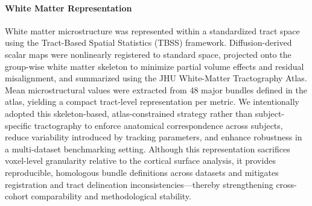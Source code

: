 \paragraph{White Matter Representation}
White matter microstructure was represented within a standardized tract space using the Tract-Based 
Spatial Statistics (TBSS) framework. Diffusion-derived scalar maps were nonlinearly registered to 
standard space, projected onto the group-wise white matter skeleton to minimize partial volume effects 
and residual misalignment, and summarized using the JHU White-Matter Tractography Atlas. Mean 
microstructural values were extracted from 48 major bundles defined in the atlas, yielding a compact 
tract-level representation per metric. We intentionally adopted this skeleton-based, atlas-constrained 
strategy rather than subject-specific tractography to enforce anatomical correspondence across subjects,
 reduce variability introduced by tracking parameters, and enhance robustness in a multi-dataset 
 benchmarking setting. Although this representation sacrifices voxel-level granularity relative to the 
 cortical surface analysis, it provides reproducible, homologous bundle definitions across datasets and
  mitigates registration and tract delineation inconsistencies—thereby strengthening cross-cohort 
  comparability and methodological stability.





